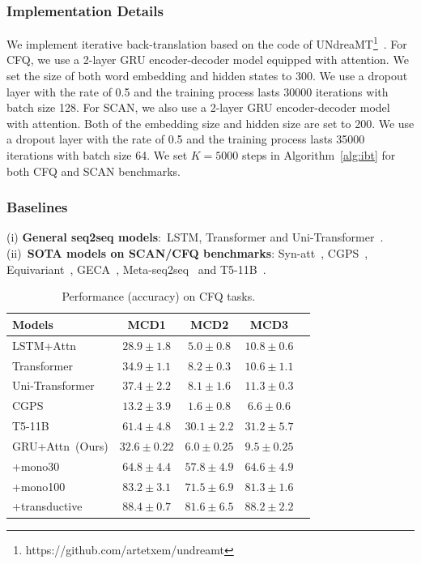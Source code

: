 \documentclass[letterpaper]{article} %
\begin{document}
\subsubsection{Implementation Details} We implement iterative back-translation based on the code of UNdreaMT\footnote{https://github.com/artetxem/undreamt}~\cite{artetxe2018iclr}. For CFQ, we use a 2-layer GRU encoder-decoder model equipped with attention. We set the size of both word embedding and hidden states to 300. We use a dropout layer with the rate of 0.5 and the training process lasts 30000 iterations with batch size 128. For SCAN, we also use a 2-layer GRU encoder-decoder model with attention. Both of the embedding size and hidden size are set to 200. We use a dropout layer with the rate of 0.5 and the training process lasts 35000 iterations with batch size 64. We set $K=5000$ steps in Algorithm~\ref{alg:ibt} for both CFQ and SCAN benchmarks.
\subsubsection{Baselines}
(i) \textbf{General seq2seq models}:~LSTM, Transformer and Uni-Transformer~\cite{keysers2020measuring}. (ii)~\textbf{SOTA models on SCAN/CFQ benchmarks}:  Syn-att~\cite{russin2019compositional}, CGPS~\cite{li2019compositional},  Equivariant~\cite{gordon2019permutation}, GECA~\cite{andreas-2020-good}, Meta-seq2seq~\cite{lake2019compositional} and T5-11B~\cite{furrer2020compositional}.

\begin{table}[tbp]
\small
\caption{Performance (accuracy) on CFQ tasks.}
\centering
\begin{tabular}{lcccc}
\toprule[1pt]
 Models & MCD1 & MCD2 & MCD3 \\
\midrule
LSTM+Attn & $28.9\pm1.8$ & $5.0\pm0.8$ & $10.8\pm0.6$  \\
Transformer & $34.9\pm1.1$ & $8.2\pm0.3$ & $10.6\pm1.1$ \\
Uni-Transformer & $37.4\pm2.2$ & $8.1\pm1.6$ & $11.3\pm0.3$\\
CGPS & $13.2\pm3.9$ & $1.6\pm0.8$ & $6.6\pm0.6$\\
T5-11B & $61.4\pm4.8$&$30.1\pm2.2$&$31.2\pm5.7$\\
\midrule[1pt]
GRU+Attn~(Ours) &\cellcolor{lightgray}$32.6\pm0.22$ &\cellcolor{lightgray}$6.0\pm0.25$ & \cellcolor{lightgray}$9.5\pm0.25$\\
\quad +mono30 & \cellcolor{lightgray}$\mathbf{64.8\pm4.4}$&\cellcolor{lightgray}$\mathbf{57.8\pm4.9}$&\cellcolor{lightgray}$\mathbf{64.6\pm4.9}$\\
\midrule
\quad +mono100&\cellcolor{lightgray}$83.2\pm3.1$&\cellcolor{lightgray}$71.5\pm6.9$&\cellcolor{lightgray}$81.3\pm1.6$\\
\quad +transductive &\cellcolor{lightgray}$88.4\pm0.7$ &\cellcolor{lightgray}$81.6\pm6.5$ &\cellcolor{lightgray}$88.2\pm2.2$\\
\bottomrule[1pt]
\end{tabular}
\label{tab:cfq}
\end{table}
\end{document}
